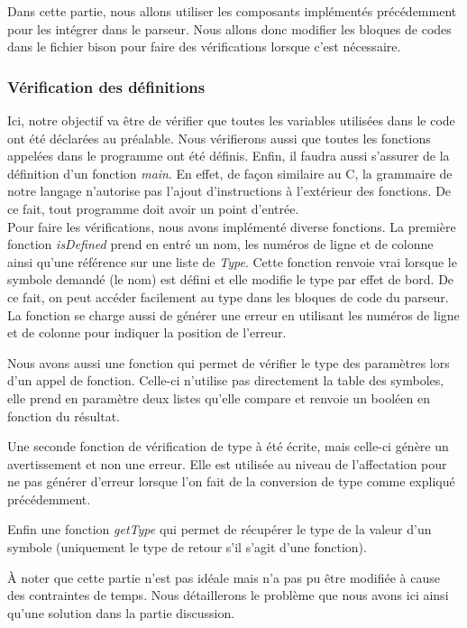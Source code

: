 \documentclass[a4paper]{article}%
\begin{document}
Dans cette partie, nous allons utiliser les composants implémentés précédemment
pour les intégrer dans le parseur. Nous allons donc modifier les bloques de
codes dans le fichier bison pour faire des vérifications lorsque c'est
nécessaire.

\subsubsection*{Vérification des définitions}\label{sec:verifDef}

Ici, notre objectif va être de vérifier que toutes les variables utilisées dans
le code ont été déclarées au préalable. Nous vérifierons aussi que toutes les
fonctions appelées dans le programme ont été définis. Enfin, il faudra aussi
s'assurer de la définition d'un fonction \textit{main}. En effet, de façon
similaire au C, la grammaire de notre langage n'autorise pas l'ajout
d'instructions à l'extérieur des fonctions. De ce fait, tout programme doit
avoir un point d'entrée.\\

Pour faire les vérifications, nous avons implémenté diverse fonctions. La
première fonction \textit{isDefined} prend en entré un nom, les numéros de
ligne et de colonne ainsi qu'une référence sur une liste de \textit{Type}.
Cette fonction renvoie vrai lorsque le symbole demandé (le nom) est défini et
elle modifie le type par effet de bord. De ce fait, on peut accéder facilement
au type dans les bloques de code du parseur. La fonction se charge aussi
de générer une erreur en utilisant les numéros de ligne et de colonne pour
indiquer la position de l'erreur.

Nous avons aussi une fonction qui permet de vérifier le type des paramètres lors
d'un appel de fonction. Celle-ci n'utilise pas directement la table des
symboles, elle prend en paramètre deux listes qu'elle compare et renvoie un
booléen en fonction du résultat.

Une seconde fonction de vérification de type à été écrite, mais celle-ci génère
un avertissement et non une erreur. Elle est utilisée au niveau de l'affectation
pour ne pas générer d'erreur lorsque l'on fait de la conversion de type comme
expliqué précédemment.

Enfin une fonction \textit{getType} qui permet de récupérer le type de la valeur
d'un symbole (uniquement le type de retour s'il s'agit d'une fonction).

À noter que cette partie n'est pas idéale mais n'a pas pu être modifiée à cause
des contraintes de temps. Nous détaillerons le problème que nous avons ici ainsi
qu'une solution dans la partie discussion.\\
\end{document}
